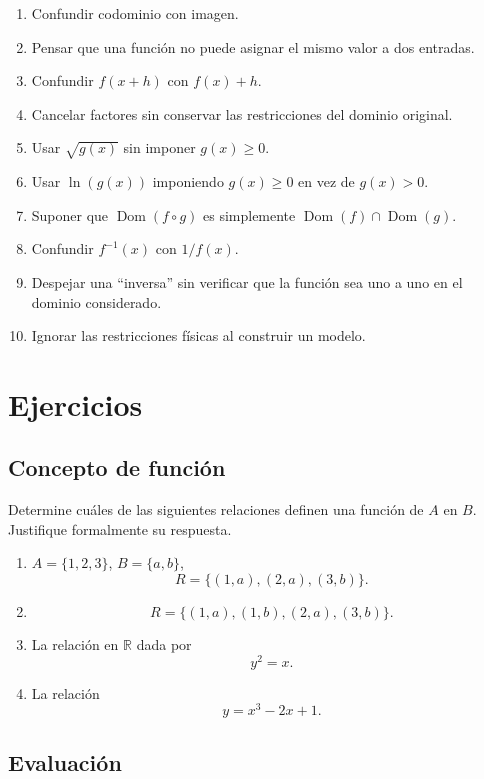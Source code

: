 \documentclass[12pt]{article}
\theoremstyle{remark}
\newcommand{\R}{\mathbb{R}}
\newcommand{\Dom}{\operatorname{Dom}}
\begin{document}
\begin{enumerate}
    \item Confundir codominio con imagen.
    \item Pensar que una función no puede asignar el mismo valor a dos entradas.
    \item Confundir $f(x+h)$ con $f(x)+h$.
    \item Cancelar factores sin conservar las restricciones del dominio original.
    \item Usar $\sqrt{g(x)}$ sin imponer $g(x)\geq0$.
    \item Usar $\ln(g(x))$ imponiendo $g(x)\geq0$ en vez de $g(x)>0$.
    \item Suponer que $\Dom(f\circ g)$ es simplemente
    $\Dom(f)\cap\Dom(g)$.
    \item Confundir $f^{-1}(x)$ con $1/f(x)$.
    \item Despejar una ``inversa'' sin verificar que la función sea uno a uno en
    el dominio considerado.
    \item Ignorar las restricciones físicas al construir un modelo.
\end{enumerate}
\newpage
\section{Ejercicios}

\subsection{Concepto de función}

Determine cuáles de las siguientes relaciones definen una función de $A$ en
$B$. Justifique formalmente su respuesta.

\begin{enumerate}
    \item $A=\{1,2,3\}$, $B=\{a,b\}$,
    \[
    R=\{(1,a),(2,a),(3,b)\}.
    \]
    \item
    \[
    R=\{(1,a),(1,b),(2,a),(3,b)\}.
    \]
    \item La relación en $\R$ dada por
    \[
    y^2=x.
    \]
    \item La relación
    \[
    y=x^3-2x+1.
    \]
\end{enumerate}

\subsection{Evaluación}
\end{document}
